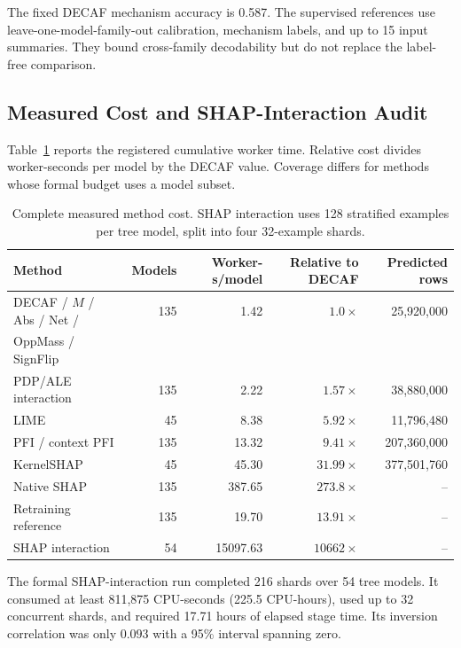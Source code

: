 The fixed DECAF mechanism accuracy is 0.587. The supervised references use leave-one-model-family-out calibration, mechanism labels, and up to 15 input summaries. They bound cross-family decodability but do not replace the label-free comparison.

\subsection{Measured Cost and SHAP-Interaction Audit}
\label{app:covertype-cost}

Table~\ref{tab:covertype-cost-full} reports the registered cumulative worker time. Relative cost divides worker-seconds per model by the DECAF value. Coverage differs for methods whose formal budget uses a model subset.

\begin{table}[htbp]
\centering
\caption{Complete measured method cost. SHAP interaction uses 128 stratified examples per tree model, split into four 32-example shards.}
\label{tab:covertype-cost-full}
\footnotesize
\begin{tabular}{lrrrr}
\toprule
Method & Models & Worker-s/model & Relative to DECAF & Predicted rows \\
\midrule
DECAF / $M$ / Abs / Net /  & 135 & 1.42 & $1.0\times$ & 25,920,000 \\
 OppMass / SignFlip &  &  &  &  \\
PDP/ALE interaction & 135 & 2.22 & $1.57\times$ & 38,880,000 \\
LIME & 45 & 8.38 & $5.92\times$ & 11,796,480 \\
PFI / context PFI & 135 & 13.32 & $9.41\times$ & 207,360,000 \\
KernelSHAP & 45 & 45.30 & $31.99\times$ & 377,501,760 \\
Native SHAP & 135 & 387.65 & $273.8\times$ & -- \\
Retraining reference & 135 & 19.70 & $13.91\times$ & -- \\
SHAP interaction & 54 & 15097.63 & $10662\times$ & -- \\
\bottomrule
\end{tabular}
\end{table}

The formal SHAP-interaction run completed 216 shards over 54 tree models. It consumed at least 811,875 CPU-seconds (225.5 CPU-hours), used up to 32 concurrent shards, and required 17.71 hours of elapsed stage time. Its inversion correlation was only $0.093$ with a 95\% interval spanning zero.

